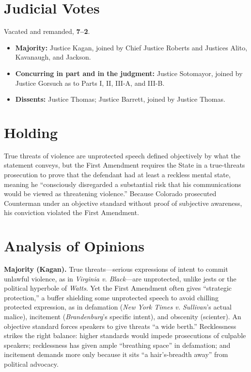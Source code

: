 \documentclass[12pt]{article}
\begin{document}
\section{Judicial Votes}

Vacated and remanded, \textbf{7--2}.
\begin{itemize}
\item \textbf{Majority:} Justice Kagan, joined by Chief Justice Roberts and Justices Alito, Kavanaugh, and Jackson.
\item \textbf{Concurring in part and in the judgment:} Justice Sotomayor, joined by Justice Gorsuch as to Parts I, II, III-A, and III-B.
\item \textbf{Dissents:} Justice Thomas; Justice Barrett, joined by Justice Thomas.
\end{itemize}

\section{Holding}

True threats of violence are unprotected speech defined objectively by what the statement conveys, but the First Amendment requires the State in a true-threats prosecution to prove that the defendant had at least a reckless mental state, meaning he ``consciously disregarded a substantial risk that his communications would be viewed as threatening violence.'' Because Colorado prosecuted Counterman under an objective standard without proof of subjective awareness, his conviction violated the First Amendment.

\section{Analysis of Opinions}

\textbf{Majority (Kagan).} True threats---serious expressions of intent to commit unlawful violence, as in \textit{Virginia v. Black}---are unprotected, unlike jests or the political hyperbole of \textit{Watts}. Yet the First Amendment often gives ``strategic protection,'' a buffer shielding some unprotected speech to avoid chilling protected expression, as in defamation (\textit{New York Times v. Sullivan}'s actual malice), incitement (\textit{Brandenburg}'s specific intent), and obscenity (scienter). An objective standard forces speakers to give threats ``a wide berth.'' Recklessness strikes the right balance: higher standards would impede prosecutions of culpable speakers; recklessness has given ample ``breathing space'' in defamation; and incitement demands more only because it sits ``a hair's-breadth away'' from political advocacy.
\end{document}
